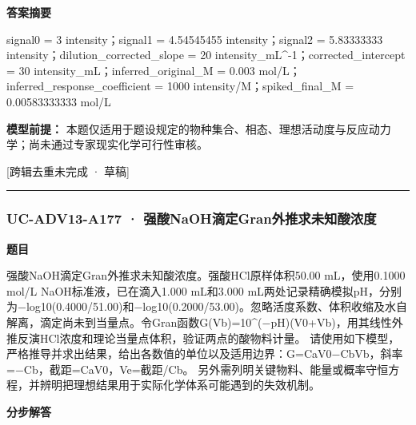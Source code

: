 \documentclass[UTF8,11pt,a4paper]{ctexart}
\begin{document}
\noindent\textbf{答案摘要}\par
signal0 = 3 intensity；signal1 = 4.54545455 intensity；signal2 = 5.83333333 intensity；dilution\_corrected\_slope = 20 intensity\_mL\textasciicircum{}-1；corrected\_intercept = 30 intensity\_mL；inferred\_original\_M = 0.003 mol/L；inferred\_response\_coefficient = 1000 intensity/M；spiked\_final\_M = 0.00583333333 mol/L\par
\noindent\textbf{模型前提：}
本题仅适用于题设规定的物种集合、相态、理想活动度与反应动力学；尚未通过专家现实化学可行性审核。\par
\noindent\textcolor{red!65!black}{[跨辑去重未完成 · 草稿]} \par
\medskip\hrule\medskip
{}
\subsubsection*{UC-ADV13-A177 · 强酸NaOH滴定Gran外推求未知酸浓度}
\noindent\textbf{题目}\par
强酸NaOH滴定Gran外推求未知酸浓度。强酸HCl原样体积50.00 mL，使用0.1000 mol/L NaOH标准液，已在滴入1.000 mL和3.000 mL两处记录精确模拟pH，分别为−log10(0.4000/51.00)和−log10(0.2000/53.00)。忽略活度系数、体积收缩及水自解离，滴定尚未到当量点。令Gran函数G(Vb)=10\textasciicircum{}(−pH)(V0+Vb)，用其线性外推反演HCl浓度和理论当量点体积，验证两点的酸物料计量。 请使用如下模型，严格推导并求出结果，给出各数值的单位以及适用边界：G=CaV0−CbVb，斜率=−Cb，截距=CaV0，Ve=截距/Cb。 另外需列明关键物料、能量或概率守恒方程，并辨明把理想结果用于实际化学体系可能遇到的失效机制。\par
\medskip\noindent\textbf{分步解答}
\end{document}
